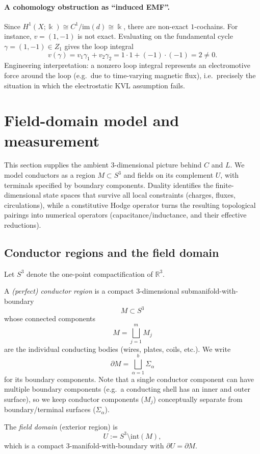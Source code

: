 \documentclass[11pt]{article}
\begin{document}
\paragraph{A cohomology obstruction as ``induced EMF''.}
Since $H^1(X;\Bbbk)\cong C^1/\mathrm{im}(d)\cong \Bbbk$, there are non-exact $1$-cochains.
For instance, $v=(1,-1)$ is not exact.
Evaluating on the fundamental cycle $\gamma=(1,-1)\in Z_1$ gives the loop integral
\[
v(\gamma)= v_1\gamma_1+v_2\gamma_2 = 1\cdot 1 + (-1)\cdot (-1)=2\neq 0.
\]
Engineering interpretation: a nonzero loop integral represents an electromotive force around the loop (e.g.\ due to time-varying magnetic flux), i.e.\ precisely the situation in which the electrostatic KVL assumption fails.

\section{Field-domain model and measurement}
\label{sec:field-domain}
This section supplies the ambient $3$-dimensional picture behind $C$ and $L$.
We model conductors as a region $M\subset S^3$ and fields on its complement $U$, with terminals specified by boundary components.
Duality identifies the finite-dimensional state spaces that survive all local constraints (charges, fluxes, circulations), while a constitutive Hodge operator turns the resulting topological pairings into numerical operators (capacitance/inductance, and their effective reductions).

\subsection{Conductor regions and the field domain}
Let $S^3$ denote the one-point compactification of $\mathbb{R}^3$.

\begin{definition}[Conductor]
A \emph{(perfect) conductor region} is a compact $3$-dimensional submanifold-with-boundary
\[
M\subset S^3
\]
whose connected components
\[
M=\bigsqcup_{j=1}^m M_j
\]
are the individual conducting bodies (wires, plates, coils, etc.).
We write
\[
\partial M=\bigsqcup_{\alpha=1}^b \Sigma_\alpha
\]
for its boundary components.
Note that a single conductor component can have multiple boundary components (e.g.\ a conducting shell has an inner and outer surface), so we keep conductor components ($M_j$) conceptually separate from boundary/terminal surfaces ($\Sigma_\alpha$).
\end{definition}

\begin{definition}
The \emph{field domain} (exterior region) is
\[
U:=S^3\setminus \mathrm{int}(M),
\]
which is a compact $3$-manifold-with-boundary with $\partial U=\partial M$.
\end{definition}
\end{document}
